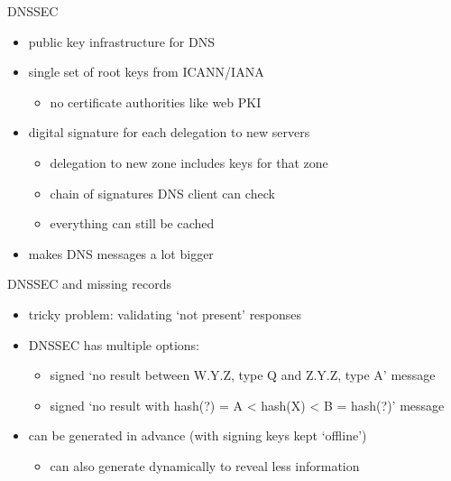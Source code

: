 \begin{frame}{DNSSEC}
    \begin{itemize}
    \item public key infrastructure for DNS
    \item single set of root keys from ICANN/IANA
        \begin{itemize}
        \item no certificate authorities like web PKI
        \end{itemize}
    \item digital signature for each delegation to new servers
        \begin{itemize}
        \item delegation to new zone includes keys for that zone
        \item chain of signatures DNS client can check
        \item everything can still be cached
        \end{itemize}
    \item makes DNS messages a lot bigger
    \end{itemize}
\end{frame}


\begin{frame}{DNSSEC and missing records}
    \begin{itemize}
    \item tricky problem: validating `not present' responses
    \vspace{.5cm}
    \item DNSSEC has multiple options:
        \begin{itemize}
        \item signed `no result between W.Y.Z, type Q and Z.Y.Z, type A' message
        \item signed `no result with hash(?) = A < hash(X) < B = hash(?)' message
        \end{itemize}
    \item can be generated in advance  (with signing keys kept `offline')
        \begin{itemize}
        \item can also generate dynamically to reveal less information
        \end{itemize}
    \end{itemize}
\end{frame}

